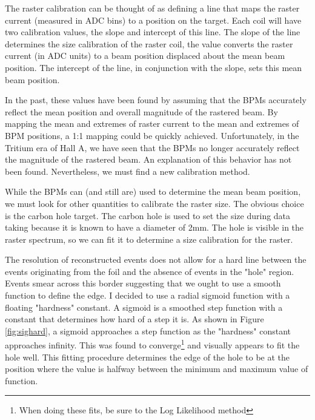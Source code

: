 The raster calibration can be thought of as defining a line that maps the raster current (measured in ADC bins) to a position on the target. Each coil will have two calibration values, the slope and intercept of this line. The slope of the line determines the size calibration of the raster coil, the value converts the raster current (in ADC units) to a beam position displaced about the mean beam position. The intercept of the line, in conjunction with the slope, sets this mean beam position.

In the past, these values have been found by assuming that the BPMs accurately reflect the mean position and overall magnitude of the rastered beam. By mapping the mean and extremes of raster current to the mean and extremes of BPM positions, a 1:1 mapping could be quickly achieved. Unfortunately, in the Tritium era of Hall A, we have seen that the BPMs no longer accurately reflect the magnitude of the rastered beam. An explanation of this behavior has not been found. Nevertheless, we must find a new calibration method.

While the BPMs can (and still are) used to determine the mean beam position, we must look for other quantities to calibrate the raster size. The obvious choice is the carbon hole target. The carbon hole is used to set the size during data taking because it is known to have a diameter of 2mm. The hole is visible in the raster spectrum, so we can fit it to determine a size calibration for the raster.

The resolution of reconstructed events does not allow for a hard line between the events originating from the foil and the absence of events in the "hole" region. Events smear across this border suggesting that we ought to use a smooth function to define the edge. I decided to use a radial sigmoid function with a floating "hardness" constant. A sigmoid is a smoothed step function with a constant that determines how hard of a step it is. As shown in Figure \ref{fig:sighard}, a sigmoid approaches a step function as the "hardness" constant approaches infinity. This was found to converge\footnote{When doing these fits, be sure to the Log Likelihood method} and visually appears to fit the hole well. This fitting procedure determines the edge of the hole to be at the position where the value is halfway between the minimum and maximum value of function.

